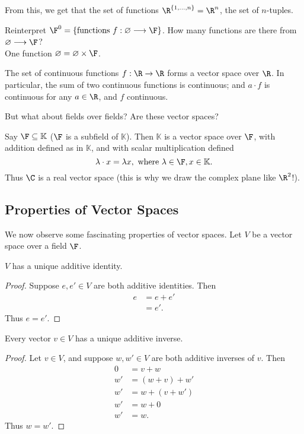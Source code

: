 \documentclass[math0540-lecture-notes.tex]{subfiles}
\begin{document}
From this, we get that the set of functions $\R^{\{ 1,\ldots,n \}}=\R^{n}$, the set of $n$-tuples.
\begin{remark}
  Reinterpret $\F^{0}=\{\text{functions}~ f:\varnothing\longrightarrow \F \}$. How many functions
  are there from $\varnothing\longrightarrow \F$?\\
  One function $\varnothing=\varnothing\times \F$.
\end{remark}

\begin{example}
  The set of continuous functions $f: \R \to \R$ forms a vector space over $\R$. In particular, the
  sum of two continuous functions is continuous; and $a\cdot f$ is continuous for any $a\in \R$, and
  $f$ continuous.
\end{example}

But what about fields over fields? Are these vector spaces?
\begin{example}
  Say $\F\subseteq \mathbb{K}$ ($\F$ is a subfield of $\mathbb{K}$). Then $\mathbb{K}$ is a vector
  space over $\F$, with addition defined as in $\mathbb{K}$, and with scalar multiplication defined
   \[
     \lambda\cdot x=\lambda x, ~\text{where}~ \lambda\in \F, x\in \mathbb{K}
   .\] Thus $\C$ is a real vector space (this is why we draw the complex plane like $\R^2$!).
\end{example}

\subsection{Properties of Vector Spaces}
We now observe some fascinating properties of vector spaces. Let $V$ be a vector space over a field
$\F$.
\begin{proposition}{}
  $V$ has a unique additive identity.
\end{proposition}
\begin{proof}[Proof]
  Suppose $e,e'\in V$ are both additive identities. Then
   \begin{align*}
      e &= e + e' \\
      &= e'
  .\end{align*} Thus $e=e'$.
\end{proof}

\begin{proposition}{}
  Every vector $v\in V$ has a unique additive inverse.
\end{proposition}
\begin{proof}[Proof]
  Let $v\in V$, and suppose $w,w'\in V$ are both additive inverses of $v$. Then
  \begin{align*}
    0 &= v+w \\
    w' &= (w+v)+w' \\
    w' &= w+(v+w') \\
    w'&= w+0 \\
    w' &= w
  .\end{align*} Thus $w=w'$.
\end{proof}
\end{document}
